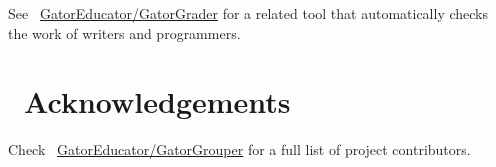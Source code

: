 \documentclass[a0paper,fleqn]{betterposter}
\begin{document}
{  \vspace*{.25in}
  See \faGithubAlt~\underline{GatorEducator/GatorGrader} for a related tool that
  automatically checks the work of writers and programmers.

  \section{\faThumbsOUp~Acknowledgements}
  Check \faGithubAlt~\underline{GatorEducator/GatorGrouper} for a full list of
  project contributors.


}
\end{document}
